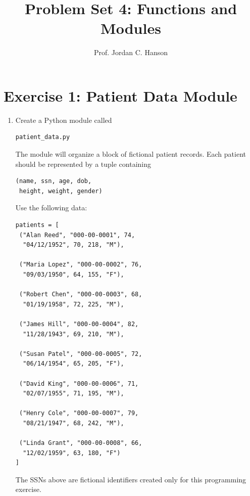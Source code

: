 \documentclass{article}
\begin{document}
\twocolumn

\title{Problem Set 4: Functions and Modules}
\author{Prof. Jordan C. Hanson}
\date{}

\maketitle

\section{Exercise 1: Patient Data Module}

\begin{enumerate}

\item Create a Python module called

\begin{verbatim}
patient_data.py
\end{verbatim}

The module will organize a block of fictional patient records.
Each patient should be represented by a tuple containing

\begin{verbatim}
(name, ssn, age, dob,
 height, weight, gender)
\end{verbatim}

Use the following data:

\begin{verbatim}
patients = [
 ("Alan Reed", "000-00-0001", 74,
  "04/12/1952", 70, 218, "M"),

 ("Maria Lopez", "000-00-0002", 76,
  "09/03/1950", 64, 155, "F"),

 ("Robert Chen", "000-00-0003", 68,
  "01/19/1958", 72, 225, "M"),

 ("James Hill", "000-00-0004", 82,
  "11/28/1943", 69, 210, "M"),

 ("Susan Patel", "000-00-0005", 72,
  "06/14/1954", 65, 205, "F"),

 ("David King", "000-00-0006", 71,
  "02/07/1955", 71, 195, "M"),

 ("Henry Cole", "000-00-0007", 79,
  "08/21/1947", 68, 242, "M"),

 ("Linda Grant", "000-00-0008", 66,
  "12/02/1959", 63, 180, "F")
]
\end{verbatim}

The SSNs above are fictional identifiers created only for this
programming exercise.

\end{enumerate}
\end{document}
